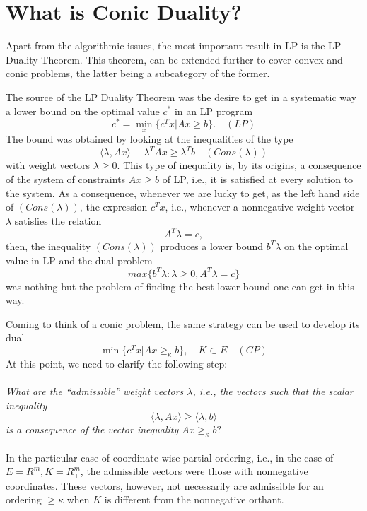 \documentclass[12pt]{article}
\begin{document}
    \section{What is Conic Duality?}
    Apart from the algorithmic issues, the most important result in LP is the LP Duality Theorem. This theorem, can be extended further to cover convex and conic problems, the latter being a subcategory of the former. \par
    The source of the LP Duality Theorem was the desire to get in a systematic way a lower bound on the
    optimal value $c^*$ in an LP program
    $$c^* = \min\limits_{x} \{ c^T x | Ax \geq b \}. \quad (LP)$$
    The bound was obtained by looking at the inequalities of the type 
    $$\langle \lambda, Ax\rangle \equiv \lambda^T Ax \geq \lambda^T b \quad (Cons(\lambda))$$
    with weight vectors $\lambda \geq 0$. This type of inequality is, by its origins, a consequence of the system of constraints $Ax \geq b$ of LP, i.e., it is satisfied at every solution to the system. As a consequence, whenever we are lucky to get, as the left hand side of $(Cons(\lambda))$, the expression $c^T x$, i.e., whenever a nonnegative weight vector $\lambda$ satisfies the relation 
    $$A^T \lambda = c,$$
    then, the inequality $(Cons(\lambda))$ produces a lower bound $b^T \lambda$ on the optimal value in LP 
    and the dual problem 
    $$max \{b^T \lambda : \lambda \geq 0, A^T \lambda = c\}$$
    was nothing but the problem of finding the best lower bound one can get in this way.\par
    Coming to think of a conic problem, the same strategy can be used to develop its dual
    $$\min \{ c^T x | Ax \geq_{\kappa}b \}, \quad K \subset E \quad (CP)$$ \newpage
    At this point, we need to clarify the following step: \\ \\
    \textit{What are the “admissible” weight vectors $\lambda$, i.e., the vectors such that the scalar 
    inequality}
    $$\langle \lambda, Ax\rangle \geq \langle \lambda, b\rangle$$
    \textit{is a consequence of the vector inequality} $Ax \geq_{\kappa} b ?$ \\ \\
    In the particular case of coordinate-wise partial ordering, i.e., in the case of $E = R^m , K = R_+^m $, 
    the admissible vectors were those with nonnegative coordinates. These vectors, however, not necessarily 
    are admissible for an ordering $\geq \kappa$ when $K$ is different from the nonnegative orthant. \\ 
\end{document}
